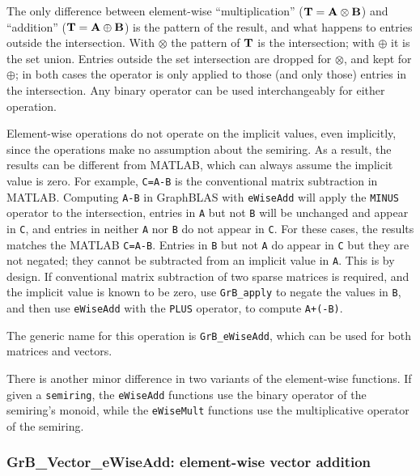 \documentclass[12pt]{article}
\begin{document}
The only difference between element-wise ``multiplication'' (${\bf T =A \otimes
B}$) and ``addition'' (${\bf T = A \oplus B}$) is the pattern of the result,
and what happens to entries outside the intersection.  With $\otimes$ the
pattern of ${\bf T}$ is the intersection; with $\oplus$ it is the set union.
Entries outside the set intersection are dropped for $\otimes$, and kept for
$\oplus$; in both cases the operator is only applied to those (and only those)
entries in the intersection.  Any binary operator can be used interchangeably
for either operation.

Element-wise operations do not operate on the implicit values, even implicitly,
since the operations make no assumption about the semiring.  As a result, the
results can be different from MATLAB, which can always assume the implicit
value is zero.  For example, \verb'C=A-B' is the conventional matrix
subtraction in MATLAB.  Computing \verb'A-B' in GraphBLAS with \verb'eWiseAdd'
will apply the \verb'MINUS' operator to the intersection, entries in \verb'A'
but not \verb'B' will be unchanged and appear in \verb'C', and entries in
neither \verb'A' nor \verb'B' do not appear in \verb'C'.  For these cases, the
results matches the MATLAB \verb'C=A-B'.  Entries in \verb'B' but not \verb'A'
do appear in \verb'C' but they are not negated; they cannot be subtracted from
an implicit value in \verb'A'.  This is by design.  If conventional matrix
subtraction of two sparse matrices is required, and the implicit value is known
to be zero, use \verb'GrB_apply' to negate the values in \verb'B', and then
use \verb'eWiseAdd' with the \verb'PLUS' operator, to compute \verb'A+(-B)'.

The generic name for this operation is \verb'GrB_eWiseAdd', which can be used
for both matrices and vectors.

There is another minor difference in two variants of the element-wise
functions.  If given a \verb'semiring', the \verb'eWiseAdd' functions use the
binary operator of the semiring's monoid, while the \verb'eWiseMult' functions
use the multiplicative operator of the semiring.

\subsubsection{{\sf GrB\_Vector\_eWiseAdd:} element-wise vector addition}
\label{eWiseAdd_vector}
\end{document}
